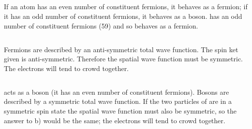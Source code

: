 \subsection{}
If an atom has an even number of constituent fermions, it behaves as a fermion; if it has an odd number of constituent fermions, it behaves as a boson.  has an odd number of constituent fermions (59) and so behaves as a fermion.

\subsection{}
Fermions are described by an anti-symmetric total wave function. The spin ket given is anti-symmetric. Therefore the spatial wave function must be symmetric. The electrons will tend to crowd together.

\subsection{}
 acts as a boson (it has an even number of constituent fermions). Bosons are described by a symmetric total wave function. If the two particles of  are in a symmetric spin state the spatial wave function must also be symmetric, so the answer to b) would be the same; the electrons will tend to crowd together.
